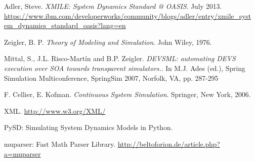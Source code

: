 \begin{thebibliography}{9}

  Adler, Steve. \textit{XMILE: System Dynamics Standard @ OASIS}. July 2013.   \url{https://www.ibm.com/developerworks/community/blogs/adler/entry/xmile_system_dynamics_standard_oasis?lang=en}

  Zeigler, B. P. \textit{Theory of Modeling and Simulation}. John Wiley, 1976.

  Mittal, S., J.L. Risco-Martín and B.P. Zeigler. \textit{DEVSML: automating DEVS execution over SOA towards transparent simulators.}. In M.J. Ades (ed.), Spring Simulation Multiconference, SpringSim 2007, Norfolk, VA, pp. 287-295

 F. Cellier, E. Kofman. \textit{Continuous System Simulation}. Springer, New York, 2006.

  XML. \url{http://www.w3.org/XML/}
 
 PySD: Simulating System Dynamics Models in Python. 
 
 muparser: Fast Math Parser Library. \url{http://beltoforion.de/article.php?a=muparser}




\end{thebibliography}
